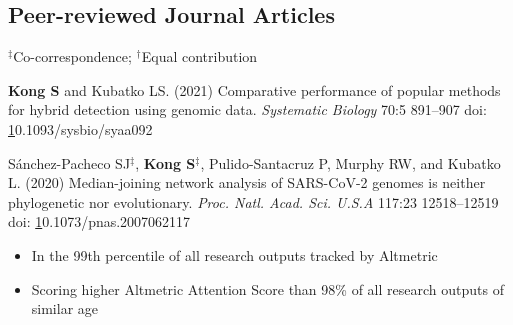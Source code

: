 \documentclass[11pt]{article}
\begin{document}
\subsection*{Peer-reviewed Journal Articles}
$^\ddag$Co-correspondence; $^\dag$Equal contribution
\begin{etaremune}

\item \textbf{Kong S} and Kubatko LS. (2021) Comparative performance of popular methods for hybrid detection using genomic data. \textit {Systematic Biology} 70:5 891–907 doi: \href{10.1093/sysbio/syaa092}10.1093/sysbio/syaa092

\item  Sánchez-Pacheco SJ{$^\ddag$}, \textbf{Kong S}{$^\ddag$}, Pulido-Santacruz P, Murphy RW, and Kubatko L. (2020) Median-joining network analysis of SARS-CoV-2 genomes is neither phylogenetic nor evolutionary. \textit{Proc. Natl. Acad. Sci. U.S.A} 117:23 12518–12519 doi: \href{https://doi.org/10.1073/pnas.2007062117}10.1073/pnas.2007062117
	
	\begin{itemize}\item In the 99th percentile of all research outputs tracked by Altmetric
				\item Scoring higher Altmetric Attention Score than 98\% of all research outputs of similar age \end{itemize}
	

\end{etaremune}
\end{document}
